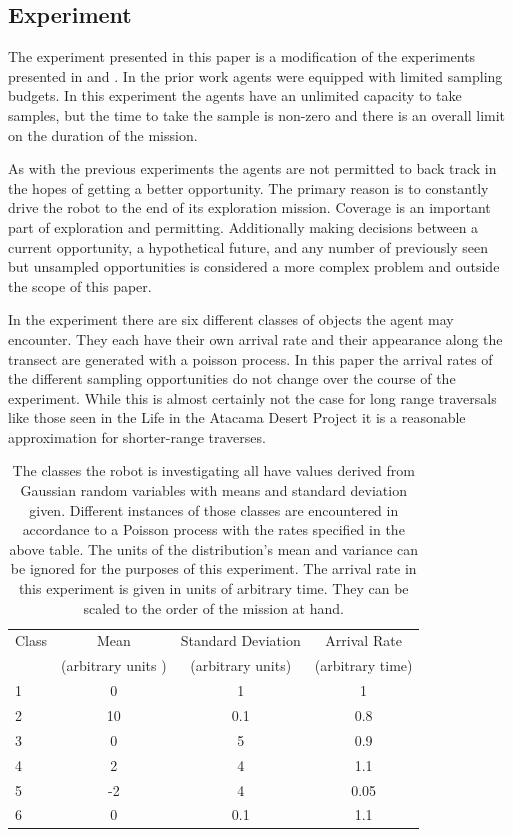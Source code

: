 \subsection{Experiment}

The experiment presented in this paper is a modification of the experiments
presented in \cite{furlong2014sequential} and \cite{furlong2014budgeting}.  In
the prior work agents were equipped with limited sampling budgets.  In this
experiment the agents have an unlimited capacity to take samples, but the time
to take the sample is non-zero and there is an overall limit on the duration of
the mission.

As with the previous experiments the agents are not permitted to back track in
the hopes of getting a better opportunity.  The primary reason is to constantly
drive the robot to the end of its exploration mission.  Coverage is an
important part of exploration and permitting.  Additionally making decisions
between a current opportunity, a hypothetical future, and any number of
previously seen but unsampled opportunities is considered a more complex
problem and outside the scope of this paper.

In the experiment there are six different classes of objects the agent may
encounter.  They each have their own arrival rate and their appearance along
the transect are generated with a poisson process.  In this paper the arrival
rates of the different sampling opportunities do not change over the course of
the experiment.  While this is almost certainly not the case for long range
traversals like those seen in the Life in the Atacama Desert Project it is a
reasonable approximation for shorter-range traverses.

\begin{table}[htpd!]
	\centering
	\begin{tabular}{l|ccc}
		Class & Mean & Standard Deviation & Arrival Rate\\
							 & (arbitrary units )  & (arbitrary units) & (arbitrary time)\\
 		\hline
		1 & 0 & 1 & 1\\
		2 & 10 & 0.1 & 0.8 \\
		3 & 0 & 5 & 0.9\\
		4 & 2 & 4 & 1.1\\
		5 & -2 & 4 & 0.05\\
		6 & 0 & 0.1 & 1.1\\
		\hline
	\end{tabular}
	\caption{The classes the robot is investigating all have values derived from Gaussian random variables with means and standard deviation given.  Different instances of those classes are encountered in accordance to a Poisson process with the rates specified in the above table.  The units of the distribution's mean and variance can be ignored for the purposes of this experiment.  The arrival rate in this experiment is given in units of arbitrary time.  They can be scaled to the order of the mission at hand.}
	\label{tbl:classes}
\end{table}

